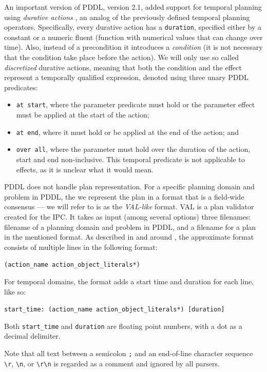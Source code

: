 An important version of PDDL, version 2.1, added support for temporal
planning using \textit{durative actions} \citep[Section~5]{Fox2003},
an analog of the previously defined temporal planning operators.
Specifically, every durative action has a \texttt{duration}, specified
either by a constant or a numeric fluent (function with numerical values that
can change over time). Also, instead of a precondition it introduces a \textit{condition} (it is not necessary that the condition take place before the action).
We will only use so called \textit{discretized} durative actions, meaning that both the condition and the effect represent a temporally qualified expression,
denoted using three unary PDDL predicates:
\begin{itemize}
\item \texttt{at start}, where the parameter predicate must hold or the parameter effect must be applied at the start of the action;
\item \texttt{at end}, where it must hold or be applied at the end of the action; and
\item \texttt{over all}, where the parameter must hold over the duration of the action, start and end non-inclusive. This temporal predicate is not applicable to effects, as it is unclear what it would mean.
\end{itemize}

PDDL does not handle plan representation. For a specific planning domain and problem in PDDL,
the we represent the plan in a format that is a field-wide consensus --- we will refer to is
as the \textit{VAL-like} format. VAL \citep{Howey2003} is a plan validator created for the IPC.
It takes as input (among several options) three filenames: filename of a planning domain and
problem in PDDL, and a filename for a plan in the mentioned format.
As described in and around \citet[Figure~2]{Howey2003}, the approximate format
consists of multiple lines in the following format:
\begin{center}
\verb+(action_name action_object_literals*)+
\end{center}

For temporal domains, the format adds a start time and duration for each line, like so:
\begin{center}
\verb+start_time: (action_name action_object_literals*) [duration]+
\end{center}
Both \verb+start_time+ and \verb+duration+ are floating point numbers, with a dot as a decimal delimiter.

Note that all text between a semicolon \verb+;+ and an end-of-line character sequence \verb+\r+, \verb+\n+, or \verb+\r\n+ is regarded as a comment and ignored by all parsers.


